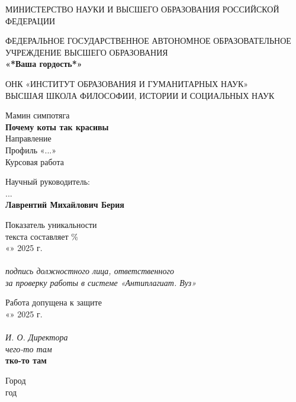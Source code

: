 \begin{titlepage}
	\centering
	\small
	МИНИСТЕРСТВО НАУКИ И ВЫСШЕГО ОБРАЗОВАНИЯ РОССИЙСКОЙ ФЕДЕРАЦИИ
	
	ФЕДЕРАЛЬНОЕ ГОСУДАРСТВЕННОЕ АВТОНОМНОЕ ОБРАЗОВАТЕЛЬНОЕ УЧРЕЖДЕНИЕ ВЫСШЕГО ОБРАЗОВАНИЯ\\
	\textbf{«*Ваша гордость*»}
	
	ОНК «ИНСТИТУТ ОБРАЗОВАНИЯ И ГУМАНИТАРНЫХ НАУК»\\ %
	ВЫСШАЯ ШКОЛА ФИЛОСОФИИ, ИСТОРИИ И СОЦИАЛЬНЫХ НАУК
	
	\vfill
	
	\large
	Мамин симпотяга\\[0.5em]
	\textbf{Почему коты так красивы}\\[0.5em]
	
	\small
	Направление \\
	Профиль «...»\\
	Курсовая работа
	
	\vfill
	\begin{flushright}
	Научный руководитель:\\
	...\\ %
	\textbf{Лаврентий Михайлович Берия}\\[2em]
	\end{flushright}
	
	\begin{flushleft}
	Показатель уникальности \\
	текста составляет \underline{\hspace{2cm}} \%\\[1em]
	«\underline{\hspace{1cm}}» \underline{\hspace{3cm}} 2025 г.\\
	\underline{\hspace{6cm}}\\
	\textit{подпись должностного лица, ответственного \\
		 за проверку работы в системе «Антиплагиат. Вуз»}
	
	\vspace{2em}
	
	Работа допущена к защите\\
	«\underline{\hspace{1cm}}» \underline{\hspace{3cm}} 2025 г.\\
	\underline{\hspace{6cm}}\\
	\textit{И. О. Директора \\
	чего-то там}\\
	\textbf{тко-то там}	
	\vfill
	\end{flushleft}
	Город \\
	год
\end{titlepage}
